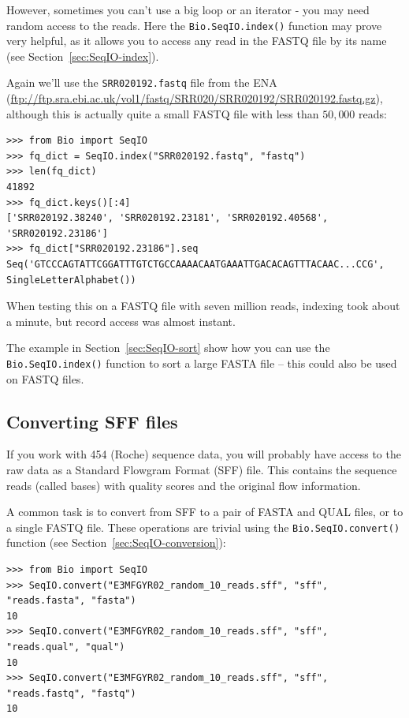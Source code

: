 \documentclass{report}
\begin{document}
However, sometimes you can't use a big loop or an iterator - you may need
random access to the reads. Here the \verb|Bio.SeqIO.index()| function
may prove very helpful, as it allows you to access any read in the FASTQ file
by its name (see Section~\ref{sec:SeqIO-index}).

Again we'll use the \texttt{SRR020192.fastq} file from the ENA
(\url{ftp://ftp.sra.ebi.ac.uk/vol1/fastq/SRR020/SRR020192/SRR020192.fastq.gz}),
although this is actually quite a small FASTQ file with less than $50,000$ reads:

\begin{verbatim}
>>> from Bio import SeqIO
>>> fq_dict = SeqIO.index("SRR020192.fastq", "fastq")
>>> len(fq_dict)
41892
>>> fq_dict.keys()[:4]
['SRR020192.38240', 'SRR020192.23181', 'SRR020192.40568', 'SRR020192.23186']
>>> fq_dict["SRR020192.23186"].seq
Seq('GTCCCAGTATTCGGATTTGTCTGCCAAAACAATGAAATTGACACAGTTTACAAC...CCG', SingleLetterAlphabet())
\end{verbatim}

When testing this on a FASTQ file with seven million reads,
indexing took about a minute, but record access was almost instant.

The example in Section~\ref{sec:SeqIO-sort} show how you can use the
\verb|Bio.SeqIO.index()| function to sort a large FASTA file -- this
could also be used on FASTQ files.

\subsection{Converting SFF files}
\label{sec:SeqIO-sff-conversion}

If you work with 454 (Roche) sequence data, you will probably have access
to the raw data as a Standard Flowgram Format (SFF) file. This contains
the sequence reads (called bases) with quality scores and the original
flow information.

A common task is to convert from SFF to a pair of FASTA and QUAL files,
or to a single FASTQ file. These operations are trivial using the
\verb|Bio.SeqIO.convert()| function (see Section~\ref{sec:SeqIO-conversion}):

\begin{verbatim}
>>> from Bio import SeqIO
>>> SeqIO.convert("E3MFGYR02_random_10_reads.sff", "sff", "reads.fasta", "fasta")
10
>>> SeqIO.convert("E3MFGYR02_random_10_reads.sff", "sff", "reads.qual", "qual")
10
>>> SeqIO.convert("E3MFGYR02_random_10_reads.sff", "sff", "reads.fastq", "fastq")
10
\end{verbatim}
\end{document}
